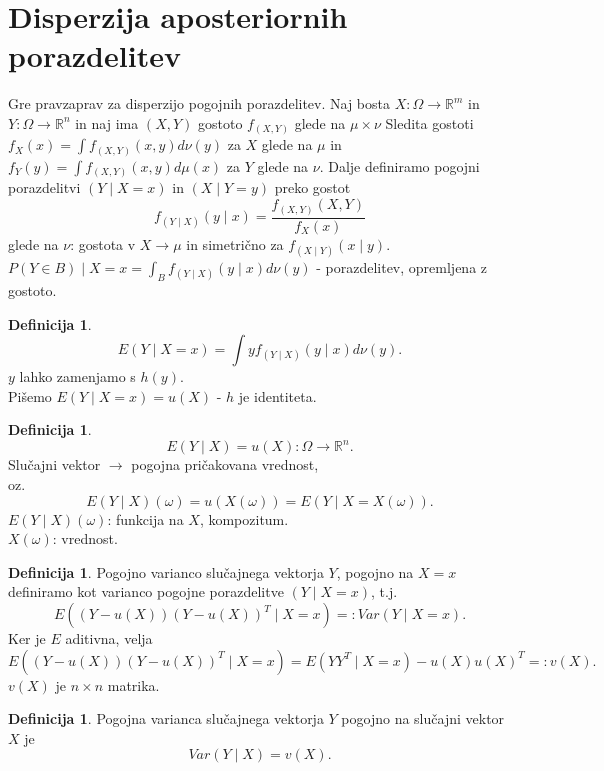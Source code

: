 \documentclass[a4paper, 12pt]{book}
\theoremstyle{definition}
\newtheorem{defn}[counter]{Definicija}
\theoremstyle{remark}
\newcommand{\R}{\mathbb{R}}
\begin{document}

\section{Disperzija aposteriornih porazdelitev}

Gre pravzaprav za disperzijo pogojnih porazdelitev.
Naj bosta $X: \Omega \to \R^m$ in $Y: \Omega \to \R^n$ in naj ima $(X,Y)$ gostoto $f_{(X,Y)}$ glede na $\mu \times \nu$
Sledita gostoti \\
$f_X(x) = \int f_{(X,Y)}(x,y) d\nu (y)$ za $X$ glede na $\mu$ in \\
$f_Y(y) = \int f_{(X,Y)}(x,y) d\mu (x)$ za $Y$ glede na $\nu$.
Dalje definiramo pogojni porazdelitvi $(Y \mid X = x)$ in $(X \mid Y = y)$ preko gostot
\begin{equation*}
  f_{(Y \mid X)}(y \mid x) = \frac{f_{(X,Y)}(X,Y)}{f_X(x)}
\end{equation*}
glede na $\nu$: gostota v $X \to \mu$ in simetrično za $f_{(X \mid Y)}(x \mid y)$. \\
$P(Y \in B) \mid X = x = \int_B f_{(Y \mid X)}(y \mid x) d\nu (y)$ - porazdelitev, opremljena z gostoto.
\begin{defn}
  \begin{equation*}
    E(Y \mid X = x) = \int y f_{(Y \mid X)}(y \mid x) d\nu (y).
  \end{equation*}
  $y$ lahko zamenjamo s $h(y)$. \\
  Pišemo $E(Y \mid X = x) = u(X)$ - $h$ je identiteta.
\end{defn}
\begin{defn}
  \begin{equation*}
    E(Y \mid X) = u(X): \Omega \to \R^n.
  \end{equation*}
  Slučajni vektor $\to$ pogojna pričakovana vrednost, \\
  oz.
  \begin{equation*}
    E(Y \mid X)(\omega) = u(X(\omega)) = E(Y \mid X = X(\omega)).
  \end{equation*}
  $E(Y \mid X)(\omega)$: funkcija na $X$, kompozitum. \\
  $X(\omega)$: vrednost.
\end{defn}
\begin{defn}
  Pogojno varianco slučajnega vektorja $Y$, pogojno na $X = x$ definiramo kot varianco pogojne porazdelitve $(Y \mid X = x)$, t.j.
  \begin{equation*}
    E((Y - u(X))(Y - u(X))^T \mid X = x) =: Var(Y \mid X = x).
  \end{equation*}
  Ker je $E$ aditivna, velja
  \begin{equation*}
    E((Y - u(X))(Y - u(X))^T \mid X = x) = E(Y Y^T \mid X = x) - u(X) u(X)^T =: v(X).
  \end{equation*}
  $v(X)$ je $n \times n$ matrika.
\end{defn}
\begin{defn}
  Pogojna varianca slučajnega vektorja $Y$ pogojno na slučajni vektor $X$ je
  \begin{equation*}
    Var(Y \mid X) = v(X).
  \end{equation*}
\end{defn}
\end{document}

